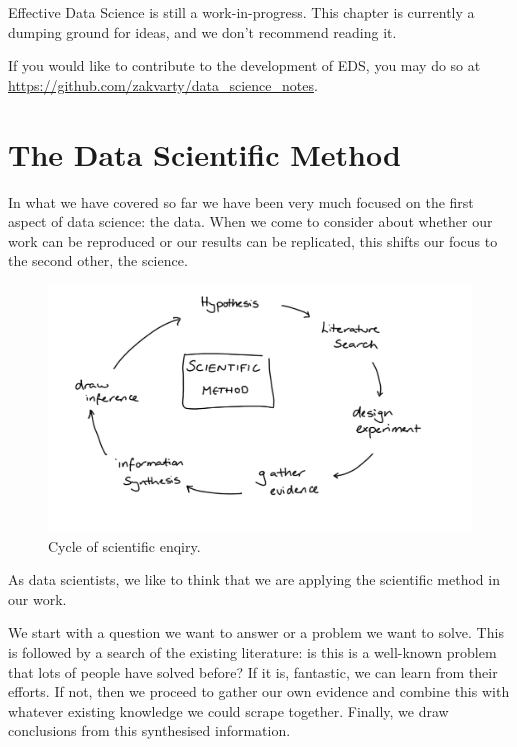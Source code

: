 \documentclass[
  12pt,
]{book}
\begin{document}
Effective Data Science is still a work-in-progress. This chapter is currently a dumping ground for ideas, and we don't recommend reading it.

If you would like to contribute to the development of EDS, you may do so at \url{https://github.com/zakvarty/data_science_notes}.

\hypertarget{the-data-scientific-method}{%
\section{The Data Scientific Method}\label{the-data-scientific-method}}

In what we have covered so far we have been very much focused on the first aspect of data science: the data. When we come to consider about whether our work can be reproduced or our results can be replicated, this shifts our focus to the second other, the science.

\begin{figure}
\includegraphics[width=16.67in]{images/401-production-reproducibility/scientific-method} \caption{Cycle of scientific enqiry.}\label{fig:unnamed-chunk-2}
\end{figure}

As data scientists, we like to think that we are applying the scientific method in our work.

We start with a question we want to answer or a problem we want to solve. This is followed by a search of the existing literature: is this is a well-known problem that lots of people have solved before? If it is, fantastic, we can learn from their efforts. If not, then we proceed to gather our own evidence and combine this with whatever existing knowledge we could scrape together. Finally, we draw conclusions from this synthesised information.
\end{document}
